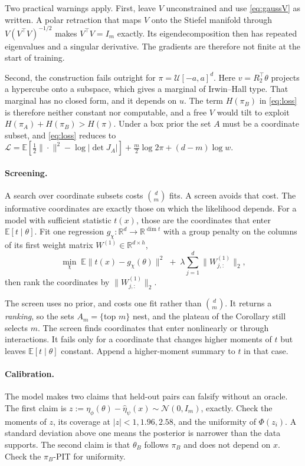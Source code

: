 \documentclass[11pt, letterpaper]{article}
\theoremstyle{definition}
\begin{document}
Two practical warnings apply. First, leave $V$ unconstrained and use
\eqref{eq:gaussV} as written. A polar retraction that maps $V$ onto the Stiefel
manifold through $V(V^\top V)^{-1/2}$ makes $V^\top V=I_m$ exactly. Its
eigendecomposition then has repeated eigenvalues and a singular derivative. The
gradients are therefore not finite at the start of training.

Second, the construction fails outright for $\pi=\mathcal{U}[-a,a]^d$.
Here $v=R_2^\top\theta$ projects a
hypercube onto a subspace, which gives a marginal of Irwin--Hall type. That
marginal has no closed form, and it depends on $u$. The term $H(\pi_B)$ in
\eqref{eq:loss} is therefore neither constant nor computable, and a free $V$
would tilt to exploit $H(\pi_A)+H(\pi_B)>H(\pi)$. Under a box prior the set $A$
must be a coordinate subset, and \eqref{eq:loss} reduces to
$\mathcal{L}=\mathbb{E}[\tfrac12\|\cdot\|^2-\log|\det J_A|]+\tfrac m2\log2\pi+(d-m)\log w$.

\paragraph{Screening.}
A search over coordinate subsets costs $\binom dm$ fits. A screen avoids that
cost. The informative coordinates are exactly those on which the likelihood
depends. For
a model with sufficient statistic $t(x)$, those are the coordinates that enter
$\mathbb{E}[t\mid\theta]$. Fit one regression
$g_\chi:\mathbb{R}^d\to\mathbb{R}^{\dim t}$ with a group penalty on the columns
of its first weight matrix $W^{(1)}\in\mathbb{R}^{d\times h}$,
\begin{equation}
  \min_\chi\;\mathbb{E}\bigl\|t(x)-g_\chi(\theta)\bigr\|^2
  \;+\;\lambda\sum_{j=1}^{d}\bigl\|W^{(1)}_{j,:}\bigr\|_2 ,
  \label{eq:screen}
\end{equation}
then rank the coordinates by $\|W^{(1)}_{j,:}\|_2$.

The screen uses no prior,
and costs one fit rather than $\binom dm$. It returns a \emph{ranking}, so the
sets $A_m=\{$top $m\}$ nest, and the plateau of the Corollary still selects
$m$. The screen finds coordinates that enter nonlinearly or through
interactions. It fails only for a coordinate that changes higher moments of $t$
but leaves $\mathbb{E}[t\mid\theta]$ constant. Append a higher-moment summary
to $t$ in that case.

\paragraph{Calibration.}
The model makes two claims that held-out pairs can falsify without an oracle.
The first claim is
$z:=\eta_\phi(\theta)-\hat\eta_\psi(x)\sim\mathcal{N}(0,I_m)$, exactly. Check
the moments of $z$, its coverage at $|z|<1,1.96,2.58$, and the uniformity of
$\Phi(z_i)$. A standard deviation above one means the posterior is narrower
than the data supports. The second claim is that $\theta_B$ follows $\pi_B$ and
does not depend on $x$. Check the $\pi_B$-PIT for uniformity.
\end{document}
